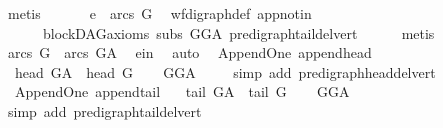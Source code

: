 \begin{isabellebody}
\ metis\ \isanewline
\ \ \isamarkupfalse%
\ \isamarkupfalse%
\ {\isachardoublequoteopen}e\ {\isasymnotin}\ arcs\ G{\isachardoublequoteclose}\ \isamarkupfalse%
\ wf{\isacharunderscore}{\kern0pt}digraph{\isacharunderscore}{\kern0pt}def\ app{\isacharunderscore}{\kern0pt}notin\ \isanewline
\ \ \ \ \ \ blockDAG{\isacharunderscore}{\kern0pt}axioms\ subs{\isacharparenleft}{\kern0pt}{}{\isacharparenright}{\kern0pt}\ GG{\isacharunderscore}{\kern0pt}A\ pre{\isacharunderscore}{\kern0pt}digraph{\isachardot}{\kern0pt}tail{\isacharunderscore}{\kern0pt}del{\isacharunderscore}{\kern0pt}vert\isanewline
\ \ \ \ \isamarkupfalse%
\ metis\ \isanewline
\ \ \isamarkupfalse%
\ \isamarkupfalse%
\ {\isachardoublequoteopen}arcs\ G\ {\isasymnoteq}\ arcs\ G{\isacharunderscore}{\kern0pt}A{\isachardoublequoteclose}\ \isamarkupfalse%
\ e{\isacharunderscore}{\kern0pt}in\ \isamarkupfalse%
\ auto\isanewline
{}\isamarkupfalse%
%
\endisatagproof
{\isafoldproof}%
%
\isadelimproof
\isanewline
%
\endisadelimproof
\isanewline
{}\isamarkupfalse%
\ {\isacharparenleft}{\kern0pt}\ Append{\isacharunderscore}{\kern0pt}One{\isacharparenright}{\kern0pt}\ append{\isacharunderscore}{\kern0pt}head{\isacharcolon}{\kern0pt}\ \isanewline
\ \ {\isachardoublequoteopen}head\ G{\isacharunderscore}{\kern0pt}A\ {\isacharequal}{\kern0pt}\ head\ G{\isachardoublequoteclose}\isanewline
%
\isadelimproof
\ \ %
\endisadelimproof
%
\isatagproof
{}\isamarkupfalse%
\ GG{\isacharunderscore}{\kern0pt}A\ \isanewline
\ \ \isamarkupfalse%
\ {\isacharparenleft}{\kern0pt}simp\ add{\isacharcolon}{\kern0pt}\ pre{\isacharunderscore}{\kern0pt}digraph{\isachardot}{\kern0pt}head{\isacharunderscore}{\kern0pt}del{\isacharunderscore}{\kern0pt}vert{\isacharparenright}{\kern0pt}%
\endisatagproof
{\isafoldproof}%
%
\isadelimproof
\ \isanewline
%
\endisadelimproof
\isanewline
{}\isamarkupfalse%
\ {\isacharparenleft}{\kern0pt}\ Append{\isacharunderscore}{\kern0pt}One{\isacharparenright}{\kern0pt}\ append{\isacharunderscore}{\kern0pt}tail{\isacharcolon}{\kern0pt}\ \isanewline
\ \ {\isachardoublequoteopen}tail\ G{\isacharunderscore}{\kern0pt}A\ {\isacharequal}{\kern0pt}\ tail\ G{\isachardoublequoteclose}\isanewline
%
\isadelimproof
\ \ %
\endisadelimproof
%
\isatagproof
{}\isamarkupfalse%
\ GG{\isacharunderscore}{\kern0pt}A\ \isanewline
\ \ \isamarkupfalse%
\ {\isacharparenleft}{\kern0pt}simp\ add{\isacharcolon}{\kern0pt}\ pre{\isacharunderscore}{\kern0pt}digraph{\isachardot}{\kern0pt}tail{\isacharunderscore}{\kern0pt}del{\isacharunderscore}{\kern0pt}vert{\isacharparenright}{\kern0pt}%

\end{isabellebody}
